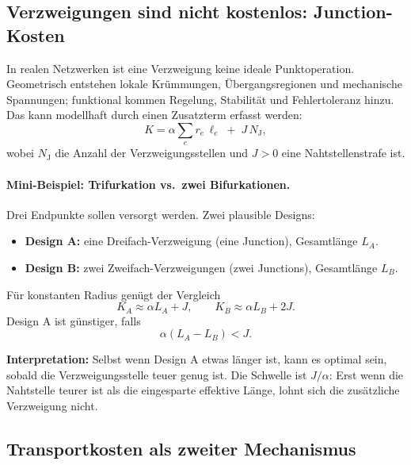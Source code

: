 \subsection{Verzweigungen sind nicht kostenlos: Junction-Kosten}

In realen Netzwerken ist eine Verzweigung keine ideale Punktoperation.
Geometrisch entstehen lokale Krümmungen, Übergangsregionen und mechanische Spannungen;
funktional kommen Regelung, Stabilität und Fehlertoleranz hinzu.
Das kann modellhaft durch einen Zusatzterm erfasst werden:
\begin{equation}
	K = \alpha \sum_e r_e\,\ell_e \;+\; J\,N_{\text{J}},
	\label{eq:cost_with_junctions}
\end{equation}
wobei $N_{\text{J}}$ die Anzahl der Verzweigungsstellen und $J>0$ eine \glqq Nahtstellenstrafe\grqq{} ist.

\paragraph{Mini-Beispiel: Trifurkation vs.\ zwei Bifurkationen.}

Drei Endpunkte sollen versorgt werden. Zwei plausible Designs:
\begin{itemize}
	\item \textbf{Design A:} eine Dreifach-Verzweigung (eine Junction), Gesamtlänge $L_A$.
	\item \textbf{Design B:} zwei Zweifach-Verzweigungen (zwei Junctions), Gesamtlänge $L_B$.
\end{itemize}
Für konstanten Radius genügt der Vergleich
\[
K_A \approx \alpha L_A + J,
\qquad
K_B \approx \alpha L_B + 2J.
\]
Design A ist günstiger, falls
\begin{equation}
	\alpha(L_A-L_B) < J.
	\label{eq:threshold_J}
\end{equation}

\textbf{Interpretation:}
Selbst wenn Design A etwas länger ist, kann es optimal sein, sobald die Verzweigungsstelle \glqq teuer genug\grqq{} ist.
Die Schwelle ist $J/\alpha$: Erst wenn die Nahtstelle teurer ist als die eingesparte effektive Länge,
lohnt sich die zusätzliche Verzweigung nicht.

\subsection{Transportkosten als zweiter Mechanismus}

